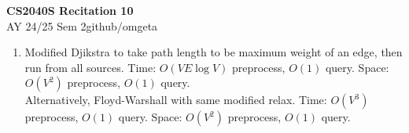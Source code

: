 \documentclass[12pt, a4paper]{article}
\newcommand{\mytitle}{CS2040S Recitation 10}
\newcommand{\myauthor}{github/omgeta}
\newcommand{\mydate}{AY 24/25 Sem 2}
\begin{document}
\raggedright
\footnotesize
\begin{center}
{\normalsize{\textbf{\mytitle}}} \\
{\footnotesize{\mydate\hspace{2pt}\textemdash\hspace{2pt}\myauthor}}
\end{center}
\begin{enumerate}[Q\arabic*.]
  \item Modified Djikstra to take path length to be maximum weight of an edge, then run from all sources. Time: $O(VE\log V)$ preprocess, $O(1)$ query. Space: $O(V^2)$ preprocess, $O(1)$ query.\\
    Alternatively, Floyd-Warshall with same modified relax. Time: $O(V^3)$ preprocess, $O(1)$ query. Space: $O(V^2)$ preprocess, $O(1)$ query. 
\end{enumerate}
\end{document}
